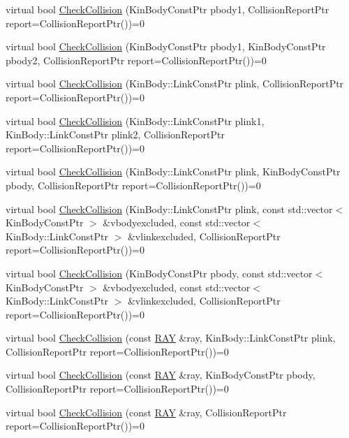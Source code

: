 \begin{DoxyCompactItemize}
\item 
virtual bool \hyperlink{classOpenRAVE_1_1EnvironmentBase_a032bda10dc517c50606781511da243d3}{CheckCollision} (KinBodyConstPtr pbody1, CollisionReportPtr report=CollisionReportPtr())=0
\item 
virtual bool \hyperlink{classOpenRAVE_1_1EnvironmentBase_ab286174aabc8a0e8b090b25963a531b3}{CheckCollision} (KinBodyConstPtr pbody1, KinBodyConstPtr pbody2, CollisionReportPtr report=CollisionReportPtr())=0
\item 
virtual bool \hyperlink{classOpenRAVE_1_1EnvironmentBase_ac4d2da56daf4dbd95074bf2dd72974a9}{CheckCollision} (KinBody::LinkConstPtr plink, CollisionReportPtr report=CollisionReportPtr())=0
\item 
virtual bool \hyperlink{classOpenRAVE_1_1EnvironmentBase_abc391362f1952f15cd5a27fdd9b8a65d}{CheckCollision} (KinBody::LinkConstPtr plink1, KinBody::LinkConstPtr plink2, CollisionReportPtr report=CollisionReportPtr())=0
\item 
virtual bool \hyperlink{classOpenRAVE_1_1EnvironmentBase_ab14f3598db6c781c3f2f6ef188fdeb3f}{CheckCollision} (KinBody::LinkConstPtr plink, KinBodyConstPtr pbody, CollisionReportPtr report=CollisionReportPtr())=0
\item 
virtual bool \hyperlink{classOpenRAVE_1_1EnvironmentBase_a8c2bdc1a68281fb48214f3c141dc26a9}{CheckCollision} (KinBody::LinkConstPtr plink, const std::vector$<$ KinBodyConstPtr $>$ \&vbodyexcluded, const std::vector$<$ KinBody::LinkConstPtr $>$ \&vlinkexcluded, CollisionReportPtr report=CollisionReportPtr())=0
\item 
virtual bool \hyperlink{classOpenRAVE_1_1EnvironmentBase_a013763101e3cb1fcad594c030e5472fe}{CheckCollision} (KinBodyConstPtr pbody, const std::vector$<$ KinBodyConstPtr $>$ \&vbodyexcluded, const std::vector$<$ KinBody::LinkConstPtr $>$ \&vlinkexcluded, CollisionReportPtr report=CollisionReportPtr())=0
\item 
virtual bool \hyperlink{classOpenRAVE_1_1EnvironmentBase_a0031940d50e5853bed26dd8f37eeb9d6}{CheckCollision} (const \hyperlink{classOpenRAVE_1_1geometry_1_1ray}{RAY} \&ray, KinBody::LinkConstPtr plink, CollisionReportPtr report=CollisionReportPtr())=0
\item 
virtual bool \hyperlink{classOpenRAVE_1_1EnvironmentBase_a91d971fb7be4e4b653fd02ee9bd6528c}{CheckCollision} (const \hyperlink{classOpenRAVE_1_1geometry_1_1ray}{RAY} \&ray, KinBodyConstPtr pbody, CollisionReportPtr report=CollisionReportPtr())=0
\item 
virtual bool \hyperlink{classOpenRAVE_1_1EnvironmentBase_a4c0906fc2d591ac8940c55ad5a16969f}{CheckCollision} (const \hyperlink{classOpenRAVE_1_1geometry_1_1ray}{RAY} \&ray, CollisionReportPtr report=CollisionReportPtr())=0

\end{DoxyCompactItemize}
